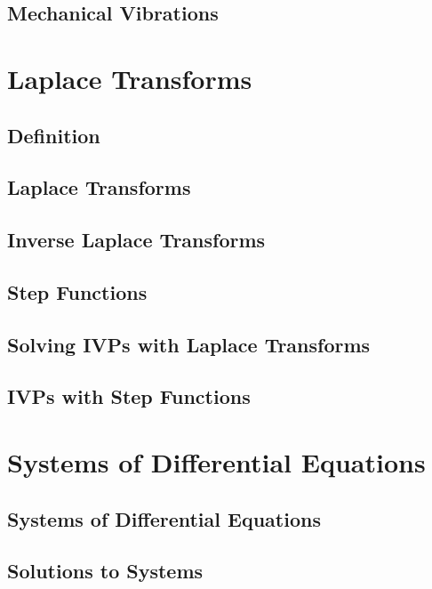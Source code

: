 \documentclass[12pt]{article}
\theoremstyle{definition}
\begin{document}
\subsection{Mechanical Vibrations}

\section{Laplace Transforms}

\subsection{Definition}

\subsection{Laplace Transforms}

\subsection{Inverse Laplace Transforms}

\subsection{Step Functions}

\subsection{Solving IVPs with Laplace Transforms}

\subsection{IVPs with Step Functions}

\section{Systems of Differential Equations}

\subsection{Systems of Differential Equations}

\subsection{Solutions to Systems}
\end{document}
